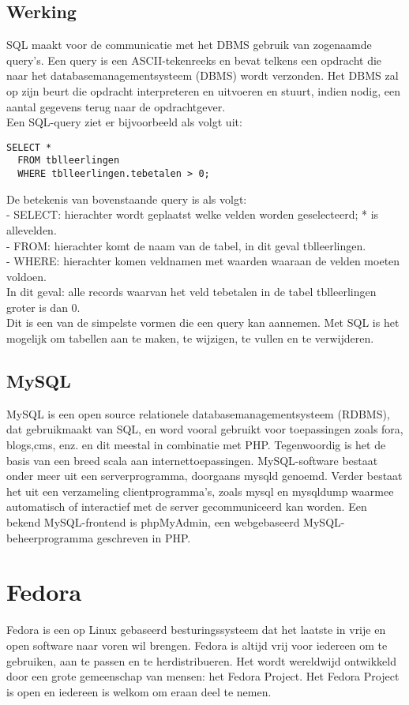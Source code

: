 \subsection{Werking}
SQL maakt voor de communicatie met het DBMS gebruik van zogenaamde query's. Een
query is een ASCII-tekenreeks en bevat telkens een opdracht die
naar het databasemanagementsysteem (DBMS) 
wordt verzonden. Het DBMS zal op zijn beurt die opdracht interpreteren en uitvoeren en stuurt, indien nodig, een aantal gegevens terug naar de opdrachtgever. \\Een SQL-query ziet er bijvoorbeeld als volgt uit:
\begin{verbatim}
SELECT *
  FROM tblleerlingen 
  WHERE tblleerlingen.tebetalen > 0;
\end{verbatim}
De betekenis van bovenstaande query is als volgt:\\
- SELECT: hierachter wordt geplaatst welke velden worden
geselecteerd; * is allevelden. \\ - FROM: hierachter komt de naam
van de tabel, in dit geval tblleerlingen. \\ - WHERE: hierachter komen veldnamen met waarden waaraan de velden
moeten voldoen. \\ In dit geval: alle records waarvan het veld tebetalen in de tabel tblleerlingen groter is dan 0.\\
Dit is een van de simpelste vormen die een query kan aannemen. Met SQL is het
mogelijk om tabellen aan te maken, te wijzigen, te vullen en te verwijderen. 
\subsection{MySQL}
MySQL is een open source relationele databasemanagementsysteem
(RDBMS), dat gebruikmaakt van SQL, en word vooral gebruikt voor toepassingen zoals fora,
blogs,cms, enz. en dit meestal in combinatie met PHP. Tegenwoordig is het
de basis van een breed scala aan internettoepassingen.
MySQL-software bestaat onder meer uit een serverprogramma, doorgaans
mysqld genoemd. Verder bestaat het uit een verzameling clientprogramma's, zoals
mysql en mysqldump waarmee automatisch of interactief met de server gecommuniceerd kan worden.
Een bekend MySQL-frontend is phpMyAdmin, een webgebaseerd MySQL-beheerprogramma
geschreven in PHP.


\section{Fedora}
Fedora is een op Linux gebaseerd besturingssysteem dat het laatste in vrije en
open software naar voren wil brengen. Fedora is altijd vrij voor iedereen om te gebruiken, 
aan te passen en te herdistribueren. Het wordt wereldwijd ontwikkeld door een grote gemeenschap 
van mensen: het Fedora Project. Het Fedora Project is open en iedereen is welkom om eraan deel te nemen.
